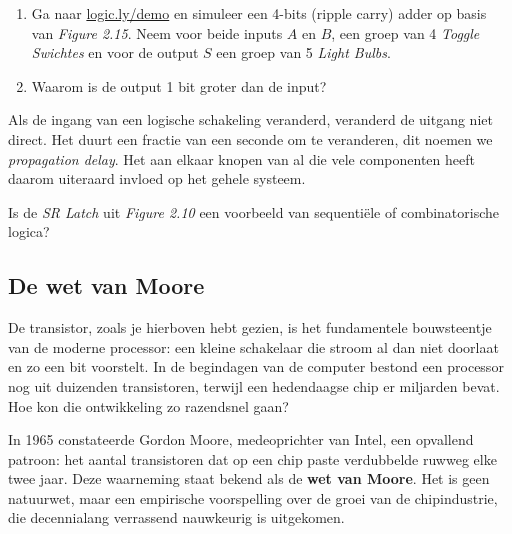 \begin{opdracht}
  \begin{minipage}[t]{0.9\linewidth}
  \begin{enumerate}
        \item [A] Ga naar \href{https://logic.ly/demo}{logic.ly/demo} en simuleer een 4-bits (ripple carry) adder op basis van \textit{Figure 2.15}. Neem voor beide inputs $A$ en $B$, een groep van 4 \textit{Toggle Swichtes} en voor de output $S$ een groep van 5 \textit{Light Bulbs}.
        \item [B] Waarom is de output 1 bit groter dan de input?
    \end{enumerate}
  \end{minipage}
\end{opdracht}

Als de ingang van een logische schakeling veranderd, veranderd de uitgang
niet direct. Het duurt een fractie van een seconde om te veranderen, dit
noemen we \textit{propagation delay}. Het aan elkaar knopen van al die vele
componenten heeft daarom uiteraard invloed op het gehele systeem.  


\begin{opdracht}
  Is de \textit{SR Latch} uit \textit{Figure 2.10} een voorbeeld van sequentiële of combinatorische logica?
\end{opdracht}

\subsection{De wet van Moore}
De transistor, zoals je hierboven hebt gezien, is het fundamentele bouwsteentje van de moderne processor: een kleine schakelaar die stroom al dan niet doorlaat en zo een bit voorstelt. In de begindagen van de computer bestond een processor nog uit duizenden transistoren, terwijl een hedendaagse chip er miljarden bevat. Hoe kon die ontwikkeling zo razendsnel gaan?

In 1965 constateerde Gordon Moore, medeoprichter van Intel, een opvallend patroon: het aantal transistoren dat op een chip paste verdubbelde ruwweg elke twee jaar. Deze waarneming staat bekend als de \textbf{wet van Moore}. 
Het is geen natuurwet, maar een empirische voorspelling over de groei van de chipindustrie, die decennialang verrassend nauwkeurig is uitgekomen.


